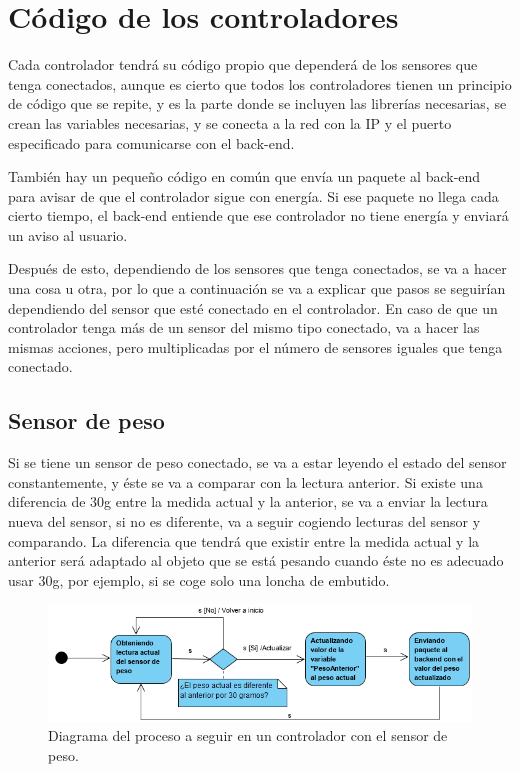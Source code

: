 \section{Código de los controladores}

Cada controlador tendrá su código propio que dependerá de los sensores que tenga conectados, aunque es cierto que todos los controladores tienen un principio de código que se repite, y es la parte donde se incluyen las librerías necesarias, se crean las variables necesarias, y se conecta a la red con la IP y el puerto especificado para comunicarse con el back-end. 

También hay un pequeño código en común que envía un paquete al back-end para avisar de que el controlador sigue con energía. Si ese paquete no llega cada cierto tiempo, el back-end entiende que ese controlador no tiene energía y enviará un aviso al usuario.

Después de esto, dependiendo de los sensores que tenga conectados, se va a hacer una cosa u otra, por lo que a continuación se va a explicar que pasos se seguirían dependiendo del sensor que esté conectado en el controlador. En caso de que un controlador tenga más de un sensor del mismo tipo conectado, va a hacer las mismas acciones, pero multiplicadas por el número de sensores iguales que tenga conectado.

\subsection{Sensor de peso}
Si se tiene un sensor de peso conectado, se va a estar leyendo el estado del sensor constantemente, y éste se va a comparar con la lectura anterior. Si existe una diferencia de 30g entre la medida actual y la anterior, se va a enviar la lectura nueva del sensor, si no es diferente, va a seguir cogiendo lecturas del sensor y comparando. La diferencia que tendrá que existir entre la medida actual y la anterior será adaptado al objeto que se está pesando cuando éste no es adecuado usar 30g, por ejemplo, si se coge solo una loncha de embutido.

\begin{figure}[h]
    \centering
    \includegraphics[width=.80\textwidth]{capitulos/capitulo6/diagramaPeso.png}
    \caption{Diagrama del proceso a seguir en un controlador con el sensor de peso.}
    \label{fig:diagramapeso}
\end{figure}

